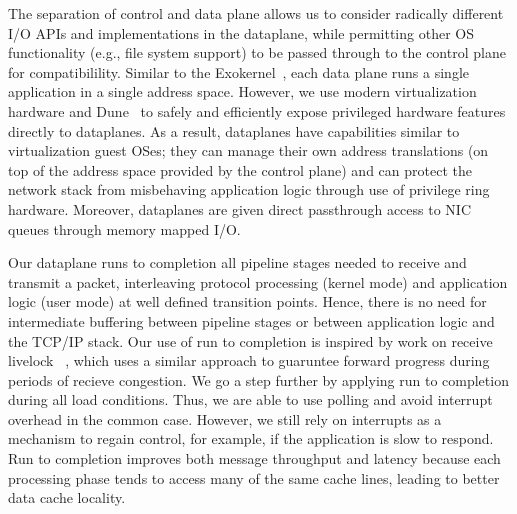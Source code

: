 The separation of control and data plane allows us to consider radically
different I/O APIs and implementations in the dataplane, while
permitting other OS functionality (e.g., file system
support) to be passed through to the control plane for compatibilility.
Similar to the
Exokernel~\cite{DBLP:conf/sosp/EnglerKO95}, each data plane runs a
single application in a single address space. However,
we use modern virtualization hardware and Dune~\cite{dune} to
safely and efficiently expose privileged hardware features directly to
dataplanes. As a result, dataplanes have capabilities similar to
virtualization guest OSes; they can manage
their own address translations (on top of the address space provided by
the control plane) and can protect the network stack from misbehaving
application logic through use of privilege ring hardware. Moreover,
dataplanes are given direct passthrough access to NIC queues through
memory mapped I/O.



 Our dataplane
runs to completion all pipeline stages needed to receive and transmit a
packet, interleaving protocol processing (kernel mode) and application
logic (user mode) at well defined transition points. Hence, there is no
need for intermediate buffering between pipeline stages or between
application logic and the TCP/IP stack.
Our use of run to completion is inspired by work on receive livelock
~\cite{receive-livelock}, which uses a similar approach
to guaruntee forward progress during periods of recieve congestion.
We go a step further by applying run to completion
during all load conditions. Thus, we are able to use polling and avoid interrupt
overhead in the common case. However, we still rely on interrupts as a
mechanism to regain control, for example, if the application is slow to respond.
Run to completion improves both message throughput
and latency because each processing phase tends to access many of the
same cache lines, leading to better data cache locality.

